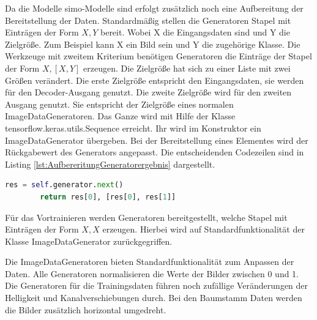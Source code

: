 	Da die Modelle \ac{simo}-Modelle sind erfolgt zusätzlich noch eine Aufbereitung der Bereitstellung der Daten. Standardmäßig stellen die Generatoren Stapel mit Einträgen der Form $X ,Y$  bereit. Wobei X die Eingangsdaten sind und Y die Zielgröße. Zum Beispiel kann X ein Bild sein und Y die zugehörige Klasse. Die Werkzeuge mit zweitem Kriterium benötigen Generatoren die Einträge der Stapel der Form $X, [X, Y]$ erzeugen. Die Zielgröße hat sich zu einer Liste mit zwei Größen verändert. Die erste Zielgröße entspricht den Eingangsdaten, sie werden für den Decoder-Ausgang genutzt. Die zweite Zielgröße wird für den zweiten Ausgang genutzt. Sie entspricht der Zielgröße eines normalen ImageDataGeneratoren. Das Ganze wird mit Hilfe der Klasse tensorflow.keras.utils.Sequence erreicht. Ihr wird im Konstruktor ein ImageDataGenerator übergeben. Bei der Bereitstellung eines Elementes wird der Rückgabewert des Generators angepasst. Die entscheidenden Codezeilen sind in Listing \ref{lst:AufbereritungGeneratorergebnis} dargestellt. 
	\begin{lstlisting}[language=python,caption=Aufbereitung Generatorergebnis in Python, label=lst:AufbereritungGeneratorergebnis]
		res = self.generator.next()
		return res[0], [res[0], res[1]]
	\end{lstlisting}
	
	Für das Vortrainieren werden Generatoren bereitgestellt, welche Stapel mit Einträgen der Form $X ,X$ erzeugen. Hierbei wird auf Standardfunktionalität der Klasse ImageDataGenerator zurückgegriffen.
	
	Die ImageDataGeneratoren bieten Standardfunktionalität zum Anpassen der Daten. Alle Generatoren normalisieren die Werte der Bilder zwischen 0 und 1. Die Generatoren für die Trainingsdaten führen noch zufällige Veränderungen der Helligkeit und Kanalverschiebungen durch. Bei den Baumstamm Daten werden die Bilder zusätzlich horizontal umgedreht. 


 


 

